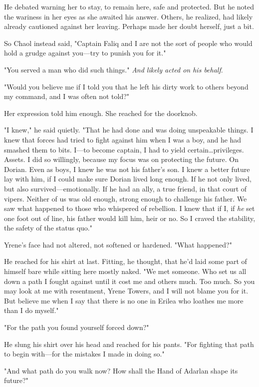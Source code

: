 He debated warning her to stay, to remain here, safe and protected.
But he noted the wariness in her eyes as she awaited his answer.
Others, he realized, had likely already cautioned against her leaving.
Perhaps made her doubt herself, just a bit.

So Chaol instead said, "Captain Faliq and I are not the sort of people who would hold a grudge against you---try to punish you for it."

"You served a man who did such things."
\emph{And likely acted on his behalf}.

"Would you believe me if I told you that he left his dirty work to others beyond my command, and I was often not told?"

Her expression told him enough.
She reached for the doorknob.

"I knew," he said quietly.
"That he had done and was doing unspeakable things.
I knew that forces had tried to fight against him when I was a boy, and he had smashed them to bits.
I---to become captain, I had to yield certain\ldots privileges.
Assets.
I did so willingly, because my focus was on protecting the future.
On Dorian.
Even as boys, I knew he was not his father's son.
I knew a better future lay with him, if I could make sure Dorian lived long enough.
If he not only lived, but also survived---emotionally.
If he had an ally, a true friend, in that court of vipers.
Neither of us was old enough, strong enough to challenge his father.
We saw what happened to those who whispered of rebellion.
I knew that if I, if \emph{he} set one foot out of line, his father would kill him, heir or no.
So I craved the stability, the safety of the status quo."

Yrene's face had not altered, not softened or hardened.
"What happened?"

He reached for his shirt at last.
Fitting, he thought, that he'd laid some part of himself bare while sitting here mostly naked.
"We met someone.
Who set us all down a path I fought against until it cost me and others much.
Too much.
So you may look at me with resentment, Yrene Towers, and I will not blame you for it.
But believe me when I say that there is no one in Erilea who loathes me more than I do myself."

"For the path you found yourself forced down?"

He slung his shirt over his head and reached for his pants.
"For fighting that path to begin with---for the mistakes I made in doing so."

"And what path do you walk now?
How shall the Hand of Adarlan shape its future?"

